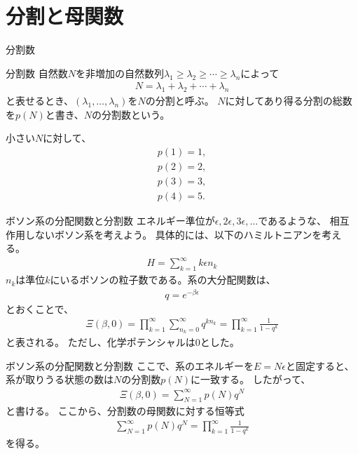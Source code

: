 \documentclass[\main/TL_liquid.tex]{subfiles}
\begin{document}
\section{分割と母関数}
\begin{frame}{分割数}
    \begin{block}{分割数}
        自然数$N$を非増加の自然数列$\lambda_1\ge\lambda_2\ge\cdots\ge\lambda_n$によって
        \begin{align}
            N = \lambda_1 + \lambda_2 + \cdots + \lambda_n
        \end{align}
        と表せるとき、$(\lambda_1,\ldots,\lambda_n)$を$N$の分割と呼ぶ。
        $N$に対してあり得る分割の総数を$p(N)$と書き、$N$の分割数という。
    \end{block}
    小さい$N$に対して、
    \begin{align*}
        p(1) = 1,
        \\
        p(2) = 2,
        \\
        p(3) = 3,
        \\
        p(4) = 5.
    \end{align*}
\end{frame}

\begin{frame}{ボソン系の分配関数と分割数}
    エネルギー準位が$\epsilon,2\epsilon,3\epsilon,\ldots$であるような、
    相互作用しないボソン系を考えよう。
    具体的には、以下のハミルトニアンを考える。
    \begin{align}
        H = \sum_{k=1}^\infty k\epsilon n_k
    \end{align}
    $n_k$は準位$k$にいるボソンの粒子数である。系の大分配関数は、
    \begin{align}
        q = e^{-\beta\epsilon}
    \end{align}
    とおくことで、
    \begin{align}
        \Xi(\beta,0)
        = \prod_{k=1}^\infty \sum_{n_k=0}^\infty q^{kn_k}
        = \prod_{k=1}^\infty \frac{1}{1-q^k}
    \end{align}
    と表される。
    ただし、化学ポテンシャルは$0$とした。
\end{frame}

\begin{frame}{ボソン系の分配関数と分割数}
    ここで、系のエネルギーを$E = N\epsilon$と固定すると、
    系が取りうる状態の数は$N$の分割数$p(N)$に一致する。
    したがって、
    \begin{align}
        \Xi(\beta,0)
        = \sum_{N=1}^\infty p(N)q^N
    \end{align}
    と書ける。
    ここから、分割数の母関数に対する恒等式
    \begin{align}
        \sum_{N=1}^\infty p(N)q^N
        = \prod_{k=1}^\infty \frac{1}{1-q^k}
    \end{align}
    を得る。
\end{frame}
\end{document}
